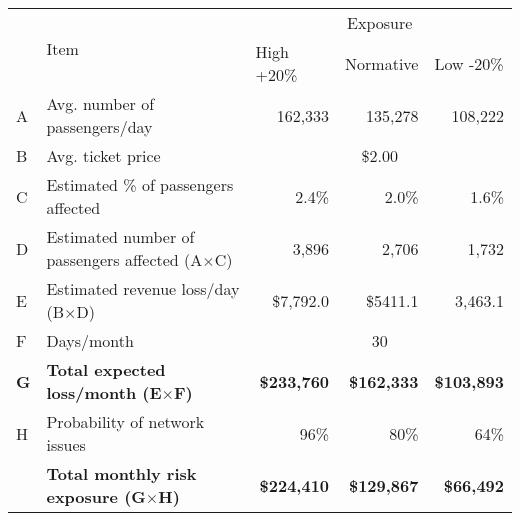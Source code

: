 \begin{table}[h]
\begin{tabularx}{\textwidth}{@{}lXrrr@{}}
\toprule
\multirow{2}{*}{} & \multirow{2}{*}{Item}                         & \multicolumn{3}{c}{Exposure}                                                                   \\ \cmidrule(l){3-5} 
                  &                                               & \multicolumn{1}{l}{High +20\%} & \multicolumn{1}{l}{Normative} & \multicolumn{1}{l}{Low -20\%} \\ \midrule
A                 & Avg. number of passengers/day                 & 162,333                        & 135,278                       & 108,222                       \\
B                 & Avg. ticket price                             & \multicolumn{3}{c}{\$2.00}                                                                     \\
C                 & Estimated \% of passengers affected           & 2.4\%                          & 2.0\%                         & 1.6\%                         \\
D                 & Estimated number of passengers affected (A$\times$C) & 3,896                          & 2,706                         & 1,732                         \\
E                 & Estimated revenue loss/day (B$\times$D)              & \$7,792.0                      & \$5411.1                      & 3,463.1                       \\
F                 & Days/month                                    & \multicolumn{3}{c}{30}                                                                         \\
\textbf{G}        & \textbf{Total expected loss/month (E$\times$F)}      & \textbf{\$233,760}             & \textbf{\$162,333}            & \textbf{\$103,893}            \\
H                 & Probability of network issues                 & 96\%                           & 80\%                          & 64\%                          \\
\textbf{}         & \textbf{Total monthly risk exposure (G$\times$H)}    & \textbf{\$224,410}             & \textbf{\$129,867}            & \textbf{\$66,492}            
\\
\bottomrule
\end{tabularx}
\end{table}